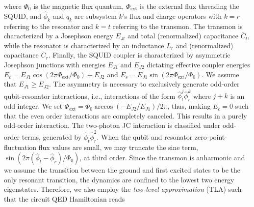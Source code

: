 where $\Phi_{0}$ is the magnetic flux quantum, $\Phi_{\text{ext}}$ is the external flux threading the SQUID, and $\hat{\phi}_k$ and $\hat{q}_k$ are subsystem $k$'s flux and charge operators with $k=r$ referring to the resonator and $k=t$ referring to the transmon. The transmon is characterized by a Josephson energy $E_{Jt}$ and total (renormalized) capacitance $\overline{C}_t$, while the resonator is characterized by an inductance $L_r$ and (renormalized) capacitance $\overline{C}_r$. Finally, the SQUID coupler is characterized by asymmetric Josephson junctions with energies $E_{J1}$ and $E_{J2}$ dictating effective coupler energies $E_c =  E_{J1}\cos(2\pi\Phi_{\text{ext}}/{\Phi_0}) + E_{J2}$ and $ E_s =  E_{J1}\sin({2\pi\Phi_{\text{ext}}}/{\Phi_0})$. We assume that $E_{J1}\geq E_{J2}$. The asymmetry is necessary to exclusively generate odd-order qubit-resonator interactions, i.e., interactions of the form $\hat{\phi}_t^{j}\hat{\phi}_r^k$ where $j+k$ is an odd integer. We set $\Phi_{\text{ext}}=\Phi_0 \arccos(-E_{J2}/E_{J1})/2\pi$, thus, making $E_c=0$ such that the even order interactions are completely canceled. This results in a purely odd-order interaction. The two-photon JC interaction is classified under odd-order terms, generated by $\hat{\phi}_t\hat{\phi}_r^2$. When the qubit and resonator zero-point-fluctuation flux values are small, we may truncate the sine term, $\sin({2\pi ( \hat{\phi}_t-\hat{\phi}_r)}/{\Phi_0})$, at third order. Since the transmon is anharmonic and we assume the transition between the ground and first excited states to be the only resonant transition, the dynamics are confined to the lowest two energy eigenstates. Therefore, we also employ the \textit{two-level approximation} (TLA) such that the circuit QED Hamiltonian reads

